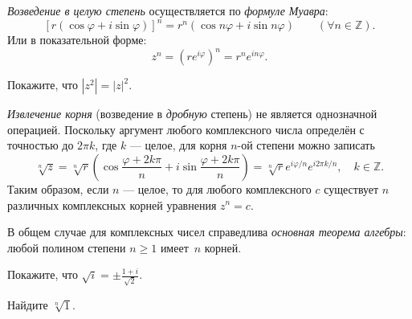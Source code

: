 \begin{labsupplement}
    \emph{Возведение в целую степень} осуществляется по \emph{формуле Муавра}:
      \begin{equation*}
        \left[r(\cos\varphi + i\sin\varphi)\right]^{n} =
        r^{n}(\cos n\varphi + i\sin n\varphi)\qquad (\forall n\in \mathbb{Z}).
    \end{equation*}
    Или в показательной форме:
    \[
     z^n = (re^{i\varphi})^n = r^n e^{in\varphi}.
    \]
    \begin{lab:exercise}
     Покажите, что $|z^2| = |z|^2$.
    \end{lab:exercise}

    \emph{Извлечение корня} (возведение в \emph{дробную} степень) не является
    однозначной операцией. Поскольку аргумент любого комплексного числа определён
    с точностью до $2\pi k$, где $k$ --- целое, для корня $n$-ой степени
    можно записать
    \begin{equation*}
        \sqrt[n]{z} = \sqrt[n]{r}\left( \cos\frac{\varphi + 2k\pi}{n} +
        i\sin\frac{\varphi + 2k\pi}{n} \right) = \sqrt[n]{r} e^{i\varphi/n}
        e^{i2\pi k/n},\quad k\in \mathbb{Z}.
    \end{equation*}
    Таким образом, если $n$ --- целое, то для любого комплексного $c$
    существует $n$ различных комплексных корней уравнения $z^n=c$.

    В общем случае для комплексных чисел справедлива
    \emph{основная теорема алгебры}: любой полином степени $n\ge 1$ имеет~$n$
    корней.

    \begin{lab:exercise}
     Покажите, что $\sqrt{i}=\pm \frac{1+i}{\sqrt{2}}$.
    \end{lab:exercise}
    \begin{lab:exercise}
     Найдите $\sqrt[n]{1}$.
    \end{lab:exercise}

\end{labsupplement}
